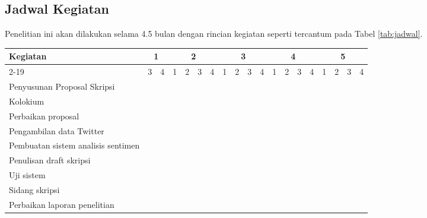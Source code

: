 \subsection*{Jadwal Kegiatan}
Penelitian ini akan dilakukan selama 4.5 bulan dengan rincian kegiatan seperti tercantum pada Tabel \ref{tab:jadwal}.
\begin{table*}[t!]
	\begin{center}
		\caption{Rencana Jadwal Penelitian}
		\label{tab:jadwal}
		\footnotesize
		\begin{tabular}{|l|c|c|c|c|c|c|c|c|c|c|c|c|c|c|c|c|c|c|}
			\hline
			\multirow{2}{*}{Kegiatan}&\multicolumn{2}{c|}{1}&\multicolumn{4}{c|}{2}&\multicolumn{4}{c|}{3}&\multicolumn{4}{c|}{4}&\multicolumn{4}{c|}{5}\\
			\cline{2-19}
			&3&4&1&2&3&4&1&2&3&4&1&2&3&4&1&2&3&4\\
			\hline
			Penyusunan Proposal Skripsi&\cellcolor{black}&\cellcolor{black}&\cellcolor{black}&\cellcolor{black}&&&&&&&&&&&&&&\\
			\hline
			Kolokium&&&&&\cellcolor{black}&&&&&&&&&&&&&\\
			\hline
			Perbaikan proposal&&&&&&\cellcolor{black}&&&&&&&&&&&&\\
			\hline
			Pengambilan data Twitter&&&&&&\cellcolor{black}&\cellcolor{black}&\cellcolor{black}&&&&&&&&&&\\
			\hline
			Pembuatan sistem analisis sentimen &&&&&&&&\cellcolor{black}&\cellcolor{black}&\cellcolor{black}&\cellcolor{black}&&&&&&&\\
			\hline
			Penulisan draft skripsi&&&&&&&&&&&&\cellcolor{black}&\cellcolor{black}&\cellcolor{black}&\cellcolor{black}&&&\\
			\hline
			Uji sistem&&&&&&&&&&&&&&&&\cellcolor{black}&&\\
			\hline
			Sidang skripsi&&&&&&&&&&&&&&&&&\cellcolor{black}&\\
			\hline
			Perbaikan laporan penelitian&&&&&&&&&&&&&&&&&&\cellcolor{black}\\
			\hline
		\end{tabular}
		\normalsize
	\end{center}
\end{table*}